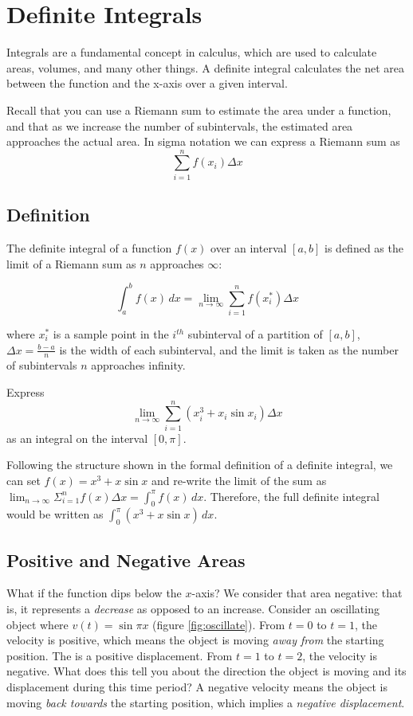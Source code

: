 \chapter{Definite Integrals}

Integrals are a fundamental concept in calculus, which are used to
calculate areas, volumes, and many other things. A definite integral
calculates the net area between the function and the x-axis over a
given interval.

Recall that you can use a Riemann sum to estimate the area under a function, and that as we increase the number of subintervals, the estimated area approaches the actual area. In sigma notation we can express a Riemann sum as $$\sum_{i=1}^{n} f(x_i)\Delta x$$

\section{Definition}

The definite integral of a function $f(x)$ over an interval $[a, b]$
is defined as the limit of a Riemann sum as $n$ approaches $\infty$:

\begin{equation}
\int_{a}^{b} f(x) \, dx = \lim_{{n \to \infty}} \sum_{i=1}^{n} f(x_i^*) \Delta x
\end{equation}

where $x_i^*$ is a sample point in the $i^{th}$ subinterval of a
partition of $[a, b]$, $\Delta x = \frac{b-a}{n}$ is the width of each
subinterval, and the limit is taken as the number of subintervals $n$
approaches infinity.

\begin{Exercise}[label=defint1]
Express $$\lim_{n \to \infty} \sum_{i=1}^{n} (x_i^3+x_i\sin{x_i})\Delta x$$ as an integral on the interval $[0, \pi]$. 
\end{Exercise}

\begin{Answer}[ref=defint1]
Following the structure shown in the formal definition of a definite integral, we can set $f(x) = x^3+x\sin{x}$ and re-write the limit of the sum as $\lim_{n \to \infty} \Sigma_{i=1}^{n} f(x)\Delta x=\int_{0}^{\pi} f(x) \, dx$. Therefore, the full definite integral would be written as $\int_{0}^{\pi} (x^3 + x\sin{x})\, dx$. 
\end{Answer}

\section{Positive and Negative Areas}
What if the function dips below the $x$-axis? We consider that area negative: that is, it represents a \textit{decrease} as opposed to an increase. Consider an oscillating object where $v(t) = \sin{\pi x}$ (figure \ref{fig:oscillate}). From $t=0$ to $t=1$, the velocity is positive, which means the object is moving \textit{away from} the starting position. The is a positive displacement. From $t=1$ to $t=2$, the velocity is negative. What does this tell you about the direction the object is moving and its displacement during this time period? A negative velocity means the object is moving \textit{back towards} the starting position, which implies a \textit{negative displacement}.

